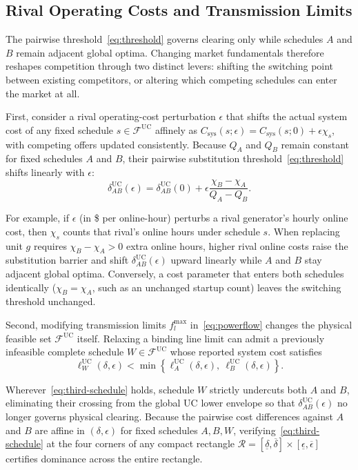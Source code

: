 \documentclass[journal]{IEEEtran}
\newcommand{\UC}{\mathrm{UC}}
\begin{document}
\subsection{Rival Operating Costs and Transmission Limits}
The pairwise threshold~\eqref{eq:threshold} governs clearing only while schedules $A$ and $B$ remain adjacent global optima. Changing market fundamentals therefore reshapes competition through two distinct levers: shifting the switching point between existing competitors, or altering which competing schedules can enter the market at all.

First, consider a rival operating-cost perturbation $\epsilon$ that shifts the actual system cost of any fixed schedule $s\in\mathcal{F}^{\UC}$ affinely as $C_{\mathrm{sys}}(s;\epsilon)=C_{\mathrm{sys}}(s;0)+\epsilon\chi_s$, with competing offers updated consistently. Because $Q_A$ and $Q_B$ remain constant for fixed schedules $A$ and $B$, their pairwise substitution threshold~\eqref{eq:threshold} shifts linearly with $\epsilon$:
\begin{equation}
\delta_{AB}^{\UC}(\epsilon)
= \delta_{AB}^{\UC}(0) + \epsilon\frac{\chi_B - \chi_A}{Q_A - Q_B}.\label{eq:threshold-shift}
\end{equation}

For example, if $\epsilon$ (in \$ per online-hour) perturbs a rival generator's hourly online cost, then $\chi_s$ counts that rival's online hours under schedule $s$. When replacing unit $g$ requires $\chi_B-\chi_A>0$ extra online hours, higher rival online costs raise the substitution barrier and shift $\delta_{AB}^{\UC}(\epsilon)$ upward linearly while $A$ and $B$ stay adjacent global optima. Conversely, a cost parameter that enters both schedules identically ($\chi_B=\chi_A$, such as an unchanged startup count) leaves the switching threshold unchanged.

Second, modifying transmission limits $f_l^{\max}$ in~\eqref{eq:powerflow} changes the physical feasible set $\mathcal{F}^{\UC}$ itself. Relaxing a binding line limit can admit a previously infeasible complete schedule $W\in\mathcal{F}^{\UC}$ whose reported system cost satisfies
\begin{equation}
\ell_W^{\UC}(\delta,\epsilon)
< \min\left\{ \ell_A^{\UC}(\delta,\epsilon),\ \ell_B^{\UC}(\delta,\epsilon) \right\}.\label{eq:third-schedule}
\end{equation}

Wherever~\eqref{eq:third-schedule} holds, schedule $W$ strictly undercuts both $A$ and $B$, eliminating their crossing from the global UC lower envelope so that $\delta_{AB}^{\UC}(\epsilon)$ no longer governs physical clearing. Because the pairwise cost differences against $A$ and $B$ are affine in $(\delta,\epsilon)$ for fixed schedules $A,B,W$, verifying~\eqref{eq:third-schedule} at the four corners of any compact rectangle $\mathcal{R}=[\underline{\delta},\overline{\delta}]\times[\underline{\epsilon},\overline{\epsilon}]$ certifies dominance across the entire rectangle.
\end{document}
